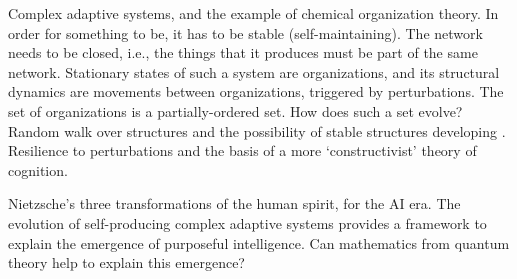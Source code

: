 Complex adaptive systems, and the example of chemical organization theory.
In order for something to be, it has to be stable (self-maintaining).
The network needs to be closed, i.e., the things that it produces must be part of the
same network.
Stationary states of such a system are organizations, and its structural dynamics are
movements between organizations, triggered by perturbations.
The set of organizations is a partially-ordered set.
How does such a set evolve?
Random walk over structures and the possibility of stable structures developing
\parencites{Veloz2023a}.
Resilience to perturbations and the basis of a more `constructivist' theory of
cognition.

Nietzsche's three transformations of the human spirit, for the AI era.
The evolution of self-producing complex adaptive systems provides a framework to
explain the emergence of purposeful intelligence.
Can mathematics from quantum theory help to explain this emergence?
